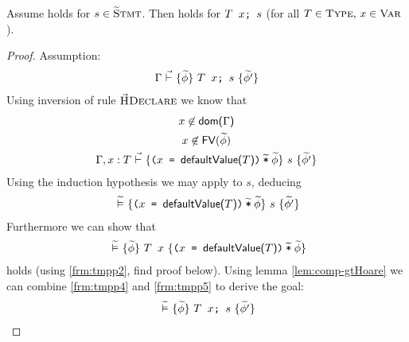 \begin{lemma}
    \label{lemma:is-decl}
    Assume  holds for $s \in \textup{\textsc{\ensuremath{\widetilde{\text{S}}}tmt}}$.
    Then  holds for $\textup{\texttt{{\textup{\texttt{$T$~$x$}}};~{$s$}}}$ (for all $T \in \textup{\textsc{Type}},\, x \in \textup{\textsc{Var}}$).
\end{lemma}
\begin{proof}
    Assumption:
    \begin{align}
    {\Gamma} \,\,\vec{\vdash}\,\, \{{\widetilde{\phi}}\} ~{\textup{\texttt{{\textup{\texttt{${T}$~${x}$}}};~{$s$}}}}~ \{{\widetilde{\phi'}}\}
    \end{align}
    Using inversion of rule $\textup{\textsc{\ensuremath{\vec{\text{H}}}Declare}}$ we know that
    \begin{gather}
    \label{frm:tmpp1}
    {x} \not\in \textup{\textmd{\textsf{dom($\Gamma$)}}} \\
    \label{frm:tmpp2}
    {x} \not \in {\textup{\textmd{\textsf{FV}}}(\widetilde{\phi})} \\
    {{\Gamma}, {x} : {T}} \,\,\vec{\vdash}\,\, \{{\textup{\texttt{${\textup{\texttt{(${\textup{\texttt{${x}$}}}$ = ${\textup{\texttt{${\textup{\textmd{\textsf{defaultValue(${T}$)}}}}$}}}$)}}}$\:$\widetilde{\textup{\texttt{*}}}$\:$\widetilde{\phi}$}}}\} ~{s}~ \{{\widetilde{\phi'}}\}
    \end{gather}
    Using the induction hypothesis we may apply  to $s$, deducing
    \begin{gather}
    \label{frm:tmpp4}
    {} \,\,\widetilde{\vDash}\,\, \{{\textup{\texttt{${\textup{\texttt{(${\textup{\texttt{${x}$}}}$ = ${\textup{\texttt{${\textup{\textmd{\textsf{defaultValue(${T}$)}}}}$}}}$)}}}$\:$\widetilde{\textup{\texttt{*}}}$\:$\widetilde{\phi}$}}}\} ~{s}~ \{{\widetilde{\phi'}}\}
    \end{gather}
    Furthermore we can show that
    \begin{gather}
    \label{frm:tmpp5}
    {} \,\,\widetilde{\vDash}\,\, \{{\widetilde{\phi}}\} ~{\textup{\texttt{${T}$~${x}$}}}~ \{{\textup{\texttt{${\textup{\texttt{(${\textup{\texttt{${x}$}}}$ = ${\textup{\texttt{${\textup{\textmd{\textsf{defaultValue(${T}$)}}}}$}}}$)}}}$\:$\widetilde{\textup{\texttt{*}}}$\:$\widetilde{\phi}$}}}\}
    \end{gather}
    holds (using \ref{frm:tmpp2}, find proof below).
    Using lemma \ref{lem:comp-gtHoare} we can combine \ref{frm:tmpp4} and \ref{frm:tmpp5} to derive the goal:
    \begin{align}
    {} \,\,\widetilde{\vDash}\,\, \{{\widetilde{\phi}}\} ~{\textup{\texttt{{\textup{\texttt{${T}$~${x}$}}};~{$s$}}}}~ \{{\widetilde{\phi'}}\}
    \end{align}
    

\end{proof}

